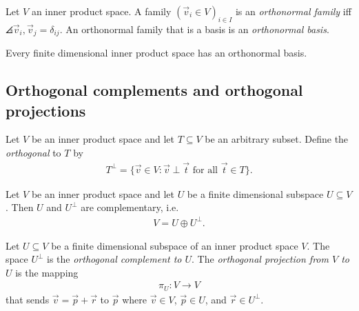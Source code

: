 \documentclass{article}
\begin{document}
\begin{definition}
	Let $V$ an inner product space. A family $(\vec v_i\in V)_{i\in I}$ is an \emph{orthonormal family}
	iff $\angles{\vec v_i,\vec v_j}=\delta_{ij}$. An orthonormal family that is a basis is an
	\emph{orthonormal basis}.
\end{definition}

\begin{theorem}[Theorem 5.1.10]
	Every finite dimensional inner product space has an orthonormal basis.
\end{theorem}

\subsection{Orthogonal complements and orthogonal projections}

\begin{definition}
	Let $V$ be an  inner product space and let $T\subseteq V$ be an arbitrary subset. Define
	the \emph{orthogonal} to $T$ by
	\begin{align*}
		T^\bot = \{\vec v \in V : \vec v \perp \vec t \text{ for all }\vec t \in T\}.
	\end{align*}
\end{definition}

\begin{proposition}[Proposition 5.2.2]
	Let $V$ be an inner product space and let $U$ be a finite dimensional subspace $U\subseteq V$.
	Then $U$ and $U^\bot$ are complementary, i.e.
	\begin{align*}
		V = U\oplus U^\bot.
	\end{align*}
\end{proposition}

\begin{definition}
	Let $U\subseteq V$ be a finite dimensional subspace of an inner product space $V$. The space $U^\bot$
	is the \emph{orthogonal complement to $U$}. The \emph{orthogonal projection from $V$ to $U$} is
	the mapping
	\begin{align*}
		\pi_U:V\to V
	\end{align*}
	that sends $\vec v = \vec p + \vec r$ to $\vec p$ where $\vec v\in V$, $\vec p\in U$, and $\vec r\in U^\bot$.
\end{definition}
\end{document}
